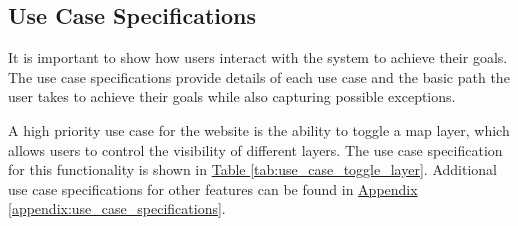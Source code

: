 \subsection{Use Case Specifications}
It is important to show how users interact with the system to achieve their goals. The use case specifications provide details of each use case and the basic path the user takes to achieve their goals while also capturing possible exceptions. 

A high priority use case for the website is the ability to toggle a map layer, which allows users to control the visibility of different layers. The use case specification for this functionality is shown in \hyperref[tab:use_case_toggle_layer]{Table \ref*{tab:use_case_toggle_layer}}. Additional use case specifications for other features can be found in \hyperref[appendix:use_case_specifications]{Appendix \ref*{appendix:use_case_specifications}}.
